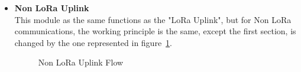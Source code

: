 \begin{itemize}
   \item \textbf{Non LoRa Uplink} \\
    This module as the same functions as the "LoRa Uplink", but for Non LoRa communications, the working principle is the same, except the first section, is changed by the one represented in figure~\ref{fig:Non_LoRA_Up}.\newline
    
    \begin{figure}[htbp]
      
      \centering
      \caption{Non LoRa Uplink Flow}
      \label{fig:Non_LoRA_Up}
    \end{figure}

\end{itemize}

